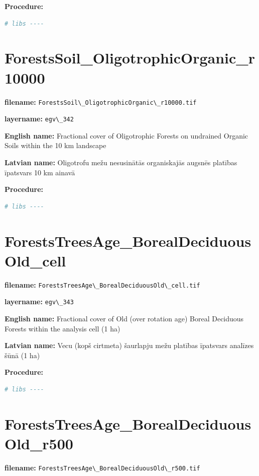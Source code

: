 \documentclass[
]{book}
\newcommand{\passthrough}[1]{#1}
\begin{document}
\textbf{Procedure:}

\begin{lstlisting}[language=R]
# libs ----
\end{lstlisting}

\section{ForestsSoil\_OligotrophicOrganic\_r10000}\label{ch06.342}

\textbf{filename:} \passthrough{\lstinline!ForestsSoil\_OligotrophicOrganic\_r10000.tif!}

\textbf{layername:} \passthrough{\lstinline!egv\_342!}

\textbf{English name:} Fractional cover of Oligotrophic Forests on undrained Organic Soils within the 10 km landscape

\textbf{Latvian name:} Oligotrofu mežu nesusinātās organiskajās augsnēs platības īpatsvars 10 km ainavā

\textbf{Procedure:}

\begin{lstlisting}[language=R]
# libs ----
\end{lstlisting}

\section{ForestsTreesAge\_BorealDeciduousOld\_cell}\label{ch06.343}

\textbf{filename:} \passthrough{\lstinline!ForestsTreesAge\_BorealDeciduousOld\_cell.tif!}

\textbf{layername:} \passthrough{\lstinline!egv\_343!}

\textbf{English name:} Fractional cover of Old (over rotation age) Boreal Deciduous Forests within the analysis cell (1 ha)

\textbf{Latvian name:} Vecu (kopš cirtmeta) šaurlapju mežu platības īpatsvars analīzes šūnā (1 ha)

\textbf{Procedure:}

\begin{lstlisting}[language=R]
# libs ----
\end{lstlisting}

\section{ForestsTreesAge\_BorealDeciduousOld\_r500}\label{ch06.344}

\textbf{filename:} \passthrough{\lstinline!ForestsTreesAge\_BorealDeciduousOld\_r500.tif!}
\end{document}
